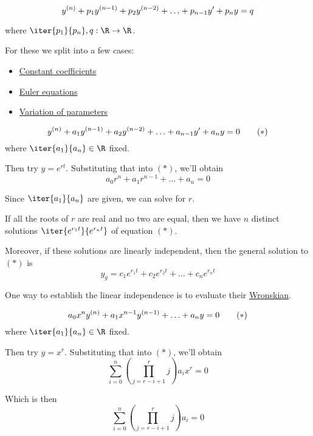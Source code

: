 \begin{equation}\def\y#1{y^{(#1)}}
	\y n+p_1\y{n-1}+p_2\y{n-2}+\ldots+p_{n-1}y'+p_ n y=q
\end{equation}

where $\iter{p_1}{p_n},q:\R\to\R$.

For these we split into a few cases:
\begin{itemize}
	\item\href{cd8a29a}{Constant coefficients}
	\item\href{a0f8e0c}{Euler equations}
	\item\href{de785b7}{Variation of parameters}
\end{itemize}

\label{cd8a29a}

\begin{equation}\def\y#1{y^{(#1)}}
	\y n+a_1\y{n-1}+a_2\y{n-2}+\ldots+a_{n-1}y'+a_ny=0\tag*{($*$)}
\end{equation}
where $\iter{a_1}{a_n}\in\R$ fixed.

Then try $y=e^{rt}$. Substituting that into $(*)$, we'll obtain
$$a_0r^n+a_1r^{n-1}+\ldots+a_n=0$$

Since $\iter{a_1}{a_n}$ are given, we can solve for $r$.

If all the roots of $r$ are real and no two are equal, then we have
$n$ distinct solutions $\iter{e^{r_1t}}{e^{r_nt}}$ of equation $(*)$.

Moreover, if these solutions are linearly independent, then the
general solution to $(*)$ is
$$y_g=c_1e^{r_1t}+c_2e^{r_2t}+\ldots+c_ne^{r_nt}$$

One way to establish the linear independence is to evaluate their
\href{b70073b}{Wronskian}.

\label{a0f8e0c}

\begin{equation}\def\y#1{x^{#1}y^{(#1)}}
	a_0\y{n}+a_1\y{n-1}+\ldots+a_ny=0\tag*{($*$)}
\end{equation}
where $\iter{a_1}{a_n}\in\R$ fixed.

Then try $y=x^{r}$. Substituting that into $(*)$, we'll obtain
$$
	\sum_{i=0}^n\left(\prod_{j=r-i+1}^rj\right) a_ix^r=0
$$

Which is then
$$
	\sum_{i=0}^n\left(\prod_{j=r-i+1}^rj\right) a_i=0
$$

\label{de785b7}

\label{ea9daf1}


